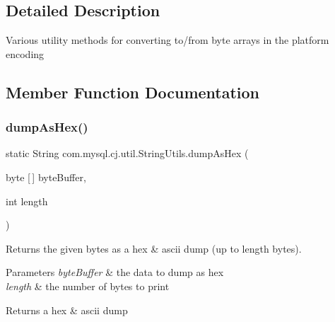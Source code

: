 \subsection{Detailed Description}
Various utility methods for converting to/from byte arrays in the platform encoding 

\subsection{Member Function Documentation}
\mbox{\label{classcom_1_1mysql_1_1cj_1_1util_1_1_string_utils_a4e06b22b83cf91a4332b171d4d8b3553}} 
\subsubsection{\texorpdfstring{dump\+As\+Hex()}{dumpAsHex()}}
{\footnotesize\ttfamily static String com.\+mysql.\+cj.\+util.\+String\+Utils.\+dump\+As\+Hex (\begin{DoxyParamCaption}\item[{byte \mbox{[}$\,$\mbox{]}}]{byte\+Buffer,  }\item[{int}]{length }\end{DoxyParamCaption})\hspace{0.3cm}{\ttfamily [static]}}

Returns the given bytes as a hex \& ascii dump (up to length bytes).


\begin{DoxyParams}{Parameters}
{\em byte\+Buffer} & the data to dump as hex \\
\hline
{\em length} & the number of bytes to print\\
\hline
\end{DoxyParams}
\begin{DoxyReturn}{Returns}
a hex \& ascii dump 
\end{DoxyReturn}
\mbox{\label{classcom_1_1mysql_1_1cj_1_1util_1_1_string_utils_af86b1077afb79a0d47ea738df3933c13}} 
